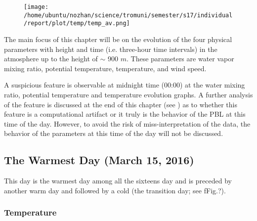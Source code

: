\documentclass[a4paper,12pt]{article}
\numberwithin{equation}{section} %
\begin{document}
\begin{figure}[H]
	\texttt{[image: /home/ubuntu/nozhan/science/tromuni/semester/s17/individual/report/plot/temp/temp\_av.png]}
\end{figure}

The main focus of this chapter will be on the evolution of the four physical parameters with height and time (i.e. three-hour time intervals) in the atmosphere up to the height of $\sim$ 900 $m$. These parameters are water vapor mixing ratio, potential temperature, temperature, and wind speed.

A suspicious feature is observable at midnight time (00:00) at the water mixing ratio, potential temperature and temperature evolution graphs. A further analysis of the feature is discussed at the end of this chapter (see ) as to whether this feature is a computational artifact or it truly is the behavior of the PBL at this time of the day. However, to avoid the risk of miss-interpretation of the data, the behavior of the parameters at this time of the day will not be discussed.

\subsection{The Warmest Day (March 15, 2016)}

This day is the warmest day among all the sixteens day and is preceded by another warm day and followed by a cold (the transition day; see fFig.?).

\subsubsection{Temperature}
\end{document}
